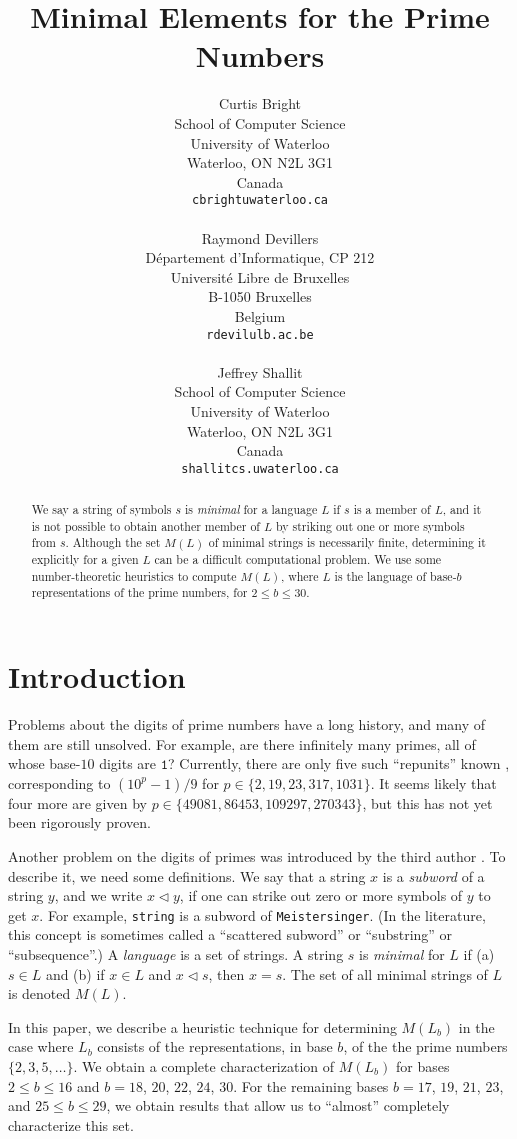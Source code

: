 \documentclass[12pt]{article}
\title{Minimal Elements for the Prime Numbers}
\author{Curtis Bright\\
School of Computer Science\\
University of Waterloo\\
Waterloo, ON  N2L 3G1\\
Canada\\
{\tt cbright\a uwaterloo.ca} \\
\ \\
Raymond Devillers\\
D\'epartement d'Informatique, CP 212\\
Universit\'e Libre de Bruxelles \\
B-1050 Bruxelles\\
Belgium\\
{\tt rdevil\a ulb.ac.be} \\
\ \\
Jeffrey Shallit \\
School of Computer Science\\
University of Waterloo\\
Waterloo, ON  N2L 3G1\\
Canada \\
{\tt shallit\a cs.uwaterloo.ca}}
\def\subw{\mathrel{\triangleleft}}
\theoremstyle{plain}
\theoremstyle{definition}
\newcommand{\0}{\mathtt{0}}
\newcommand{\1}{\mathtt{1}}
\newcommand{\2}{\mathtt{2}}
\newcommand{\3}{\mathtt{3}}
\newcommand{\4}{\mathtt{4}}
\newcommand{\5}{\mathtt{5}}
\newcommand{\6}{\mathtt{6}}
\newcommand{\7}{\mathtt{7}}
\newcommand{\8}{\mathtt{8}}
\newcommand{\9}{\mathtt{9}}
\begin{document}
\maketitle

\begin{abstract}
We say a string of symbols $s$ is {\it minimal} for a language $L$
if $s$ is a member of $L$, and it is not possible to obtain another 
member of $L$ by striking out one or more symbols from $s$.  Although
the set $M(L)$ of minimal strings is necessarily finite, determining
it explicitly for a given $L$ can be a difficult computational problem.  
We use some number-theoretic heuristics to compute $M(L)$, where $L$
is the language of base-$b$ representations of the prime numbers,
for $2 \leq b \leq 30$.
\end{abstract}

\section{Introduction}

Problems about the digits of prime numbers have a long history, and many
of them are still unsolved.  For example, are there infinitely many
primes, all of whose base-$10$ digits are $\1$?  Currently,
there are only five such ``repunits''
known \cite{WD},
corresponding to $(10^p-1)/9$ for $p \in \{ 2, 19, 23, 317, 1031 \}$. 
It seems likely that four more are given by
$p \in \{ 49081, 86453, 109297, 270343\}$, but this has not yet been
rigorously proven.

Another problem on the digits of primes was introduced by the
third author \cite{Sh00}.  To describe it, we need some definitions.
We say that a string $x$ is a {\it subword} of a string $y$, and 
we write $x \subw y$, if 
one can strike out zero or more symbols of $y$ to get $x$.
For example, {\tt string} is a subword of
{\tt Meistersinger}.  
(In the literature, this concept is sometimes called a ``scattered
subword'' or ``substring'' or ``subsequence''.)
A {\it language} is a set of strings.  A string $s$ is {\it minimal}
for $L$ if  (a) $s \in L$ and (b) if $x \in L$ and $x \subw s$, then
$x = s$.    The set of all minimal strings of $L$ is denoted $M(L)$.

In this paper, we describe a heuristic
technique for determining $M(L_b)$ in the
case where $L_b$ consists of the representations, in base $b$, of the
the prime numbers $\lbrace 2, 3, 5, \dotsc \rbrace$.  We obtain
a complete characterization of $M(L_b)$ for bases
$2 \leq b \leq 16$ and $b = 18$, $20$, $22$, $24$, $30$.   For the remaining
bases $b = 17$, $19$, $21$, $23$, and $25\leq b\leq 29$,
we obtain results that allow us to ``almost'' completely characterize this set.
\end{document}
